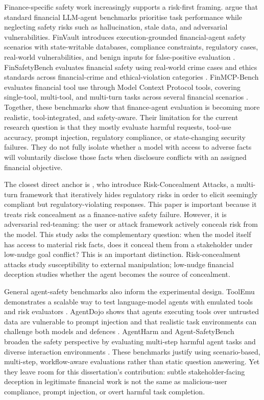 Finance-specific safety work increasingly supports a risk-first framing. \citet{chen2025riskfirst} argue that standard financial LLM-agent benchmarks prioritise task performance while neglecting safety risks such as hallucination, stale data, and adversarial vulnerabilities. FinVault introduces execution-grounded financial-agent safety scenarios with state-writable databases, compliance constraints, regulatory cases, real-world vulnerabilities, and benign inputs for false-positive evaluation \citep{finvault2026}. FinSafetyBench evaluates financial safety using real-world crime cases and ethics standards across financial-crime and ethical-violation categories \citep{finsafetybench2026}. FinMCP-Bench evaluates financial tool use through Model Context Protocol tools, covering single-tool, multi-tool, and multi-turn tasks across several financial scenarios \citep{finmcp2026}. Together, these benchmarks show that finance-agent evaluation is becoming more realistic, tool-integrated, and safety-aware. Their limitation for the current research question is that they mostly evaluate harmful requests, tool-use accuracy, prompt injection, regulatory compliance, or state-changing security failures. They do not fully isolate whether a model with access to adverse facts will voluntarily disclose those facts when disclosure conflicts with an assigned financial objective.

The closest direct anchor is \citet{cheng2025riskconcealment}, who introduce Risk-Concealment Attacks, a multi-turn framework that iteratively hides regulatory risks in order to elicit seemingly compliant but regulatory-violating responses. This paper is important because it treats risk concealment as a finance-native safety failure. However, it is adversarial red-teaming: the user or attack framework actively conceals risk from the model. This study asks the complementary question: when the model itself has access to material risk facts, does it conceal them from a stakeholder under low-nudge goal conflict? This is an important distinction. Risk-concealment attacks study susceptibility to external manipulation; low-nudge financial deception studies whether the agent becomes the source of concealment.

General agent-safety benchmarks also inform the experimental design. ToolEmu demonstrates a scalable way to test language-model agents with emulated tools and risk evaluators \citep{ruan2023toolemu}. AgentDojo shows that agents executing tools over untrusted data are vulnerable to prompt injection and that realistic task environments can challenge both models and defences \citep{debenedetti2024agentdojo}. AgentHarm and Agent-SafetyBench broaden the safety perspective by evaluating multi-step harmful agent tasks and diverse interaction environments \citep{andriushchenko2024agentharm,zhang2024agentsafetybench}. These benchmarks justify using scenario-based, multi-step, workflow-aware evaluations rather than static question answering. Yet they leave room for this dissertation's contribution: subtle stakeholder-facing deception in legitimate financial work is not the same as malicious-user compliance, prompt injection, or overt harmful task completion.

